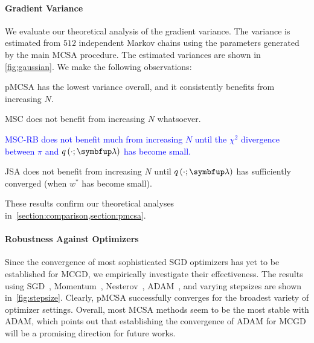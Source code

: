\paragraph{Gradient Variance}
We evaluate our theoretical analysis of the gradient variance.
The variance is estimated from \(512\) independent Markov chains using the parameters generated by the main MCSA procedure.
The estimated variances are shown in \cref{fig:gaussian}.
We make the following observations:
\begin{enumerate*}[label=\textbf{(\roman*)}]
  \item pMCSA has the lowest variance overall, and it consistently benefits from increasing \(N\).
  \item MSC does not benefit from increasing \(N\) whatsoever.
    
  \item \textcolor{blue}{
    MSC-RB does not benefit much from increasing \(N\) until the 
\(\chi^2\) divergence between \(\pi\) and \(q\left(\cdot; \vlambda\right)\) has become small.
    }
  \item JSA does not benefit from increasing \(N\) until \(q\left(\cdot; \vlambda\right)\) has sufficiently converged (when \(w^*\) has become small).
\end{enumerate*}
These results confirm our theoretical analyses in~\cref{section:comparison,section:pmcsa}.


\vspace{-1.5ex}
\paragraph{Robustness Against Optimizers}
Since the convergence of most sophisticated SGD optimizers has yet to be established for MCGD, we empirically investigate their effectiveness.
The results using SGD~\citep{robbins_stochastic_1951, bottou_optimization_2018a}, Momentum~\citep{polyak_methods_1964}, Nesterov~\citep{nesterov_method_1983}, ADAM~\citep{kingma_adam_2015}, and varying stepsizes are shown in~\cref{fig:stepsize}.
Clearly, pMCSA successfully converges for the broadest variety of optimizer settings.
Overall, most MCSA methods seem to be the most stable with ADAM, which points out that establishing the convergence of ADAM for MCGD will be a promising direction for future works.


